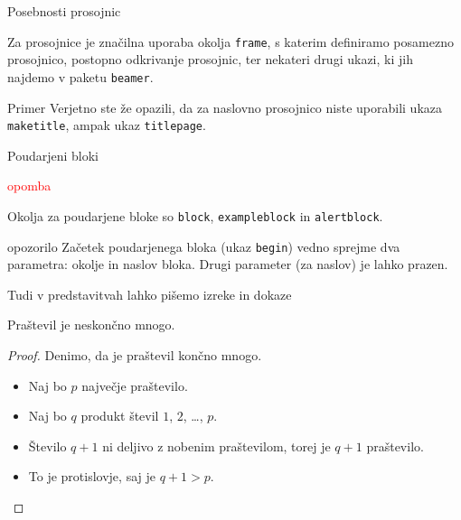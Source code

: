 \begin{frame}{Posebnosti prosojnic}

	Za prosojnice je značilna uporaba okolja \texttt{frame},
	s katerim definiramo posamezno prosojnico,
	\pause
	postopno odkrivanje prosojnic,
	\pause
	ter nekateri drugi ukazi, ki jih najdemo v paketu \texttt{beamer}.
	\pause
	\begin{exampleblock}{Primer}
		Verjetno ste že opazili, da za naslovno prosojnico niste uporabili
		ukaza \texttt{maketitle}, ampak ukaz \texttt{titlepage}.
	\end{exampleblock}
\end{frame}

\begin{frame}{Poudarjeni bloki}
\begin{block}{\textcolor{red}{opomba}}


		Okolja za poudarjene bloke so \texttt{block}, \texttt{exampleblock} in \texttt{alertblock}.
\end{block}
\begin{block}{opozorilo}
		Začetek poudarjenega bloka (ukaz \texttt{begin}) vedno sprejme 
		dva parametra: okolje in naslov bloka.
		Drugi parameter (za naslov) je lahko prazen. 
\end{block}
\end{frame}

\begin{frame}{Tudi v predstavitvah lahko pišemo izreke in dokaze}

	\begin{izrek}
	   Praštevil je neskončno mnogo.
	\end{izrek}
	\begin{proof}
	   Denimo, da je praštevil končno mnogo.
	   \begin{itemize}
		  \item<1-> Naj bo $p$ \alert<4->{največje} praštevilo.
		  \item<2-> Naj bo $q$ produkt števil $1$, $2$, \ldots, $p$.
		  \item<3-> Število $q+1$ ni deljivo z nobenim praštevilom, torej je $q+1$ praštevilo.
		  \item<4-> To je protislovje, saj je $q+1>p$. \qedhere 
	   \end{itemize}
	\end{proof}
 \end{frame}

